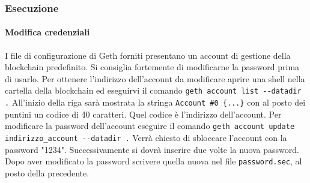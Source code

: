 \subsubsection{Esecuzione}
\paragraph{Modifica credenziali}
I file di configurazione di Geth forniti presentano un account di gestione della blockchain predefinito. Si consiglia fortemente di modificarne la password prima di usarlo.
Per ottenere l'indirizzo dell'account da modificare aprire una shell nella cartella della blockchain ed eseguirvi il comando \newline
\texttt{geth account list -{}-datadir .} \newline
All'inizio della riga sarà mostrata la stringa \newline
\texttt{Account \#0 \{...\}} \newline con al posto dei puntini un codice di 40 caratteri. Quel codice è l'indirizzo dell'account. \newline
Per modificare la password dell'account eseguire il comando \newline
\texttt{geth account update indirizzo\_account -{}-datadir .} \newline
Verrà chiesto di sbloccare l'account con la password "1234". Successivamente si dovrà inserire due volte la nuova password. \newline
Dopo aver modificato la password scrivere quella nuova nel file \texttt{password.sec}, al posto della precedente.

